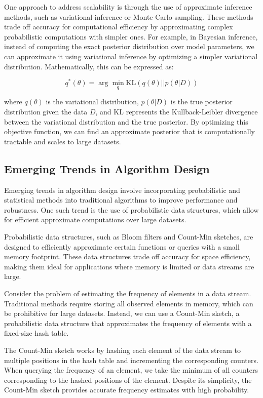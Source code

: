 \documentclass[12pt]{book} %
\begin{document}
One approach to address scalability is through the use of approximate inference methods, such as variational inference or Monte Carlo sampling. These methods trade off accuracy for computational efficiency by approximating complex probabilistic computations with simpler ones. For example, in Bayesian inference, instead of computing the exact posterior distribution over model parameters, we can approximate it using variational inference by optimizing a simpler variational distribution. Mathematically, this can be expressed as:

\[
q^*(\theta) = \arg \min_q \text{KL}(q(\theta) || p(\theta | D))
\]

where \(q(\theta)\) is the variational distribution, \(p(\theta | D)\) is the true posterior distribution given the data \(D\), and \(\text{KL}\) represents the Kullback-Leibler divergence between the variational distribution and the true posterior. By optimizing this objective function, we can find an approximate posterior that is computationally tractable and scales to large datasets.

\subsection{Emerging Trends in Algorithm Design}
Emerging trends in algorithm design involve incorporating probabilistic and statistical methods into traditional algorithms to improve performance and robustness. One such trend is the use of probabilistic data structures, which allow for efficient approximate computations over large datasets.

Probabilistic data structures, such as Bloom filters and Count-Min sketches, are designed to efficiently approximate certain functions or queries with a small memory footprint. These data structures trade off accuracy for space efficiency, making them ideal for applications where memory is limited or data streams are large.

Consider the problem of estimating the frequency of elements in a data stream. Traditional methods require storing all observed elements in memory, which can be prohibitive for large datasets. Instead, we can use a Count-Min sketch, a probabilistic data structure that approximates the frequency of elements with a fixed-size hash table.

The Count-Min sketch works by hashing each element of the data stream to multiple positions in the hash table and incrementing the corresponding counters. When querying the frequency of an element, we take the minimum of all counters corresponding to the hashed positions of the element. Despite its simplicity, the Count-Min sketch provides accurate frequency estimates with high probability.
\end{document}
